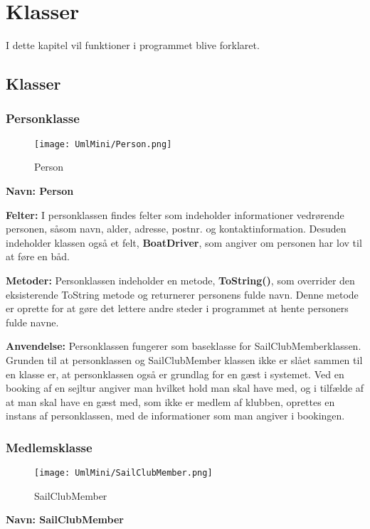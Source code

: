 \chapter{Klasser} \label{chap:klasser}
I dette kapitel vil funktioner i programmet blive forklaret.

\section{Klasser}
\subsection*{Personklasse}
\begin{wrapfigure}{l}{0.4\textwidth}
    \label{img:Person}
    \vspace{-20pt}
    \begin{center}
        \texttt{[image: UmlMini/Person.png]}
    \end{center}
    \vspace{-20pt}
    \caption{Person}
    \vspace{-10pt}
\end{wrapfigure}
\textbf{Navn: Person}

\textbf{Felter:}
I personklassen findes felter som indeholder informationer vedrørende personen, såsom navn, alder, adresse, postnr. og kontaktinformation. 
Desuden indeholder klassen også et felt, \textbf{BoatDriver}, som angiver om personen har lov til at føre en båd. 

\textbf{Metoder:}
Personklassen indeholder en metode, \textbf{ToString()}, som overrider den eksisterende ToString metode og returnerer personens fulde navn. 
Denne metode er oprette for at gøre det lettere andre steder i programmet at hente personers fulde navne.

\textbf{Anvendelse:}
Personklassen fungerer som baseklasse for SailClubMemberklassen. Grunden til at personklassen og SailClubMember klassen ikke er slået sammen til en klasse er, at personklassen også er grundlag for en gæst i systemet. 
Ved en booking af en sejltur angiver man hvilket hold man skal have med, og i tilfælde af at man skal have en gæst med, som ikke er medlem af klubben, oprettes en instans af personklassen, med de informationer som man angiver i bookingen.

\subsection*{Medlemsklasse}
\begin{wrapfigure}{l}{0.5\textwidth}
    \label{img:SailClubMember}
    \vspace{-20pt}
    \begin{center}
        \texttt{[image: UmlMini/SailClubMember.png]}
    \end{center}
    \vspace{-20pt}
    \caption{SailClubMember}
    \vspace{-10pt}
\end{wrapfigure}
\textbf{Navn: SailClubMember}

